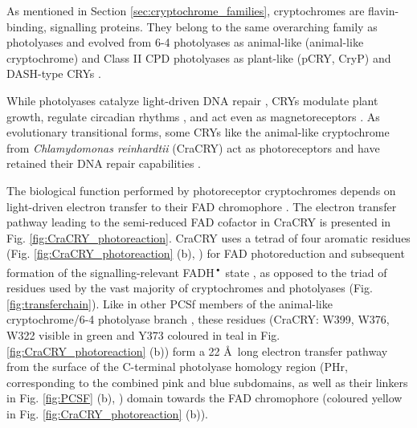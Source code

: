 As mentioned in Section \ref{sec:cryptochrome_families}, cryptochromes are flavin-binding, signalling proteins. They belong to the same overarching family as photolyases and evolved from 6-4 photolyases as animal-like (animal-like cryptochrome) and Class II CPD photolyases as plant-like (pCRY, CryP) and DASH-type CRYs \parencite{meiEvolutionaryHistoryPhotolyase2015}. 

While photolyases catalyze light-driven DNA repair \parencite{sancarMechanismsDNARepair2016, essenLightdrivenDNARepair2006}, CRYs modulate plant growth, regulate circadian rhythms \parencite{chavesCryptochromesBlueLight2011}, and act even as magnetoreceptors \parencite{ritzResonanceEffectsIndicate2004, horeRadicalPairMechanismMagnetoreception2016, xuMagneticSensitivityCryptochrome2021}. As evolutionary transitional forms, some CRYs like the animal-like cryptochrome from \textit{Chlamydomonas reinhardtii} (CraCRY) act as photoreceptors \parencite{beelFlavinBindingCryptochrome2012, petersenWorldAlgaeReveals2021, zouAnimalCryptochromeControlsChlamydomonas2017} and have retained their DNA repair capabilities \parencite{franzStructureBifunctionalCryptochrome2018}. 

The biological function performed by photoreceptor cryptochromes depends on light-driven electron transfer to their FAD chromophore \parencite{kavakliPhotolyaseCryptochromeFamily2017, chavesCryptochromesBlueLight2011, brettelReactionMechanismsDNA2010}. The electron transfer pathway leading to the semi-reduced FAD cofactor in CraCRY is presented in Fig. \ref{fig:CraCRY_photoreaction}. CraCRY uses a tetrad of four aromatic residues (Fig. \ref{fig:CraCRY_photoreaction} (b), \cite{franzStructureBifunctionalCryptochrome2018, nohrExtendedElectronTransferAnimal2016,oldemeyerEssentialRoleUnusually2016}) for FAD photoreduction and subsequent formation of the signalling-relevant FADH\textsuperscript{•} state \parencite{beelFlavinBindingCryptochrome2012}, as opposed to the triad of residues used by the vast majority of cryptochromes and photolyases (Fig. \ref{fig:transferchain}). Like in other PCSf members of the animal-like cryptochrome/6-4 photolyase branch \parencite{martinUltrafastFlavinPhotoreduction2017,timmerTrackingElectronTransfer2023}, these residues (CraCRY: W399, W376, W322 visible in green and Y373 coloured in teal in Fig. \ref{fig:CraCRY_photoreaction} (b)) form a 22 \AA\ long electron transfer pathway from the surface of the C-terminal photolyase homology region (PHr, corresponding to the combined pink and blue subdomains, as well as their linkers in Fig. \ref{fig:PCSF} (b), \cite{meiEvolutionaryHistoryPhotolyase2015}) domain towards the FAD chromophore (coloured yellow in Fig. \ref{fig:CraCRY_photoreaction} (b)). 

